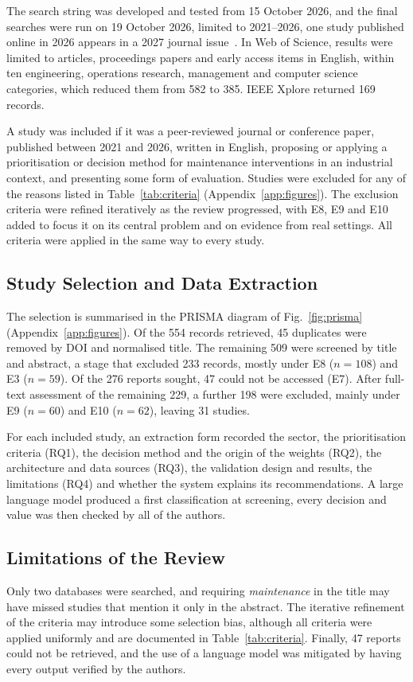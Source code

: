 The search string was developed and tested from 15 October 2026, and the final searches were run on 19 October 2026, limited to 2021--2026, one study published online in 2026 appears in a 2027 journal issue~\cite{li2027}. In Web of Science, results were limited to articles, proceedings papers and early access items in English, within ten engineering, operations research, management and computer science categories, which reduced them from 582 to 385. IEEE Xplore returned 169 records.

A study was included if it was a peer-reviewed journal or conference paper, published between 2021 and 2026, written in English, proposing or applying a prioritisation or decision method for maintenance interventions in an industrial context, and presenting some form of evaluation. Studies were excluded for any of the reasons listed in Table~\ref{tab:criteria} (Appendix~\ref{app:figures}). The exclusion criteria were refined iteratively as the review progressed, with E8, E9 and E10 added to focus it on its central problem and on evidence from real settings. All criteria were applied in the same way to every study.

\subsection{Study Selection and Data Extraction}
\label{sec:selection}

The selection is summarised in the PRISMA diagram of Fig.~\ref{fig:prisma} (Appendix~\ref{app:figures}). Of the 554 records retrieved, 45 duplicates were removed by DOI and normalised title. The remaining 509 were screened by title and abstract, a stage that excluded 233 records, mostly under E8 ($n=108$) and E3 ($n=59$). Of the 276 reports sought, 47 could not be accessed (E7). After full-text assessment of the remaining 229, a further 198 were excluded, mainly under E9 ($n=60$) and E10 ($n=62$), leaving 31 studies.

\label{sec:extraction}
For each included study, an extraction form recorded the sector, the prioritisation criteria (RQ1), the decision method and the origin of the weights (RQ2), the architecture and data sources (RQ3), the validation design and results, the limitations (RQ4) and whether the system explains its recommendations. A large language model produced a first classification at screening, every decision and value was then checked by all of the authors.

\subsection{Limitations of the Review}
\label{sec:review-limitations}

Only two databases were searched, and requiring \textit{maintenance} in the title may have missed studies that mention it only in the abstract. The iterative refinement of the criteria may introduce some selection bias, although all criteria were applied uniformly and are documented in Table~\ref{tab:criteria}. Finally, 47 reports could not be retrieved, and the use of a language model was mitigated by having every output verified by the authors.